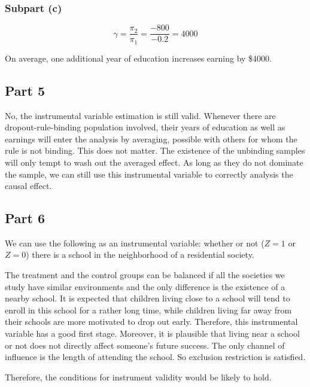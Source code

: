 \documentclass{article}
\begin{document}
\subsubsection{Subpart (c)}
\begin{equation*}
\gamma=\frac{\pi_2}{\pi_1}=\frac{-800}{-0.2}=4000
\end{equation*}

On average, one additional year of education increases earning by \$4000.

\subsection{Part 5}
No, the instrumental variable estimation is still valid. Whenever there are dropout-rule-binding population involved, their years of education as well as earnings will enter the analysis by averaging, possible with others for whom the rule is not binding. This does not matter. The existence of the unbinding samples will only tempt to wash out the averaged effect. As long as they do not dominate the sample, we can still use this instrumental variable to correctly analysis the causal effect.

\subsection{Part 6}
We can use the following as an instrumental variable: whether or not ($Z=1$ or $Z=0$) there is a school in the neighborhood of a residential society.

The treatment and the control groups can be balanced if all the societies we study have similar environments and the only difference is the existence of a nearby school. It is expected that children living close to a school will tend to enroll in this school for a rather long time, while children living far away from their schools are more motivated to drop out early. Therefore, this instrumental variable has a good first stage. Moreover, it is plausible that living near a school or not does not directly affect someone's future success. The only channel of influence is the length of attending the school. So exclusion restriction is satisfied.

Therefore, the conditions for instrument validity would be likely to hold.
\end{document}
